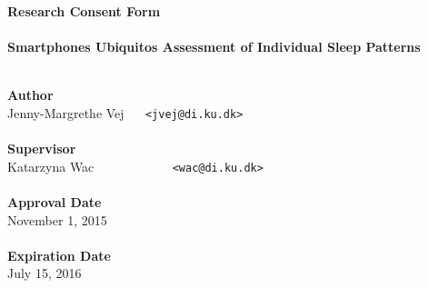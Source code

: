 \documentclass[a4paper,oneside]{memoir}
\begin{document}
    \thispagestyle{empty}
    \begin{adjustwidth}{-3cm}{-1.5cm}
    \vspace*{1.6cm}
    \textbf{\Huge Research Consent Form} \\
    \vspace*{1.5cm} \\
    \textbf{\Huge Smartphones Ubiquitos Assessment of Individual Sleep Patterns} \\
    \vspace*{.1cm} \\
    \begin{tabbing}
    \textbf{\Large Author} \\
    Jenny-Margrethe Vej ~~ \= \texttt{<jvej@di.ku.dk>} \\
    \vspace*{.1cm} \\
    \textbf{\Large Supervisor} \\
    Katarzyna Wac ~~~~~~~~~~~ \= \texttt{<wac@di.ku.dk>} \\
    \vspace*{.1cm} \\
    \textbf{\Large Approval Date} \\
    November 1, 2015\\
    \vspace*{.1cm} \\
    \textbf{\Large Expiration Date} \\
    July 15, 2016
    \\[9.3cm]
    \end{tabbing}
    \end{adjustwidth}
    \ClearWallPaper
\end{document}
